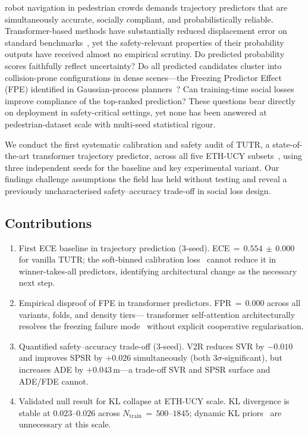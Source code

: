 \documentclass[journal,letterpaper]{IEEEtran}
\begin{document}
 robot navigation in pedestrian crowds demands
trajectory predictors that are simultaneously accurate, socially
compliant, and probabilistically reliable.
Transformer-based methods have substantially reduced displacement error
on standard benchmarks~\cite{shi2023tutr,mohamed2020social}, yet the
safety-relevant properties of their probability outputs have received
almost no empirical scrutiny.
Do predicted probability scores faithfully reflect uncertainty?
Do all predicted candidates cluster into collision-prone configurations
in dense scenes---the Freezing Predictor Effect (FPE) identified in
Gaussian-process planners~\cite{trautman2010unfreezing}?
Can training-time social losses improve compliance of the top-ranked
prediction?
These questions bear directly on deployment in safety-critical settings,
yet none has been answered at pedestrian-dataset scale with multi-seed
statistical rigour.

We conduct the first systematic calibration and safety audit of TUTR,
a state-of-the-art transformer trajectory predictor, across all five
ETH-UCY subsets~\cite{pellegrini2009eth,lerner2007ucy}, using three
independent seeds for the baseline and key experimental variant.
Our findings challenge assumptions the field has held without testing
and reveal a previously uncharacterised safety--accuracy trade-off in
social loss design.

\subsection*{Contributions}

\begin{enumerate}

\item First ECE baseline in trajectory prediction (3-seed).
ECE\,\(=\,0.554\,\pm\,0.000\) for vanilla TUTR; the soft-binned
calibration loss~\cite{karandikar2021soft} cannot reduce it in
winner-takes-all predictors, identifying architectural change as the
necessary next step.

\item Empirical disproof of FPE in transformer predictors.
FPR\,\(=\,0.000\) across all variants, folds, and density tiers---
transformer self-attention architecturally resolves the freezing
failure mode~\cite{trautman2010unfreezing} without explicit cooperative
regularisation.

\item Quantified safety--accuracy trade-off (3-seed).
V2R reduces SVR by \(-0.010\) and improves SPSR by \(+0.026\)
simultaneously (both \(3\sigma\)-significant), but increases ADE
by \(+0.043\)\,m---a trade-off SVR and SPSR surface and ADE/FDE
cannot.

\item Validated null result for KL collapse at ETH-UCY scale.
KL divergence is stable at \(0.023\)--\(0.026\) across
\(N_{\text{train}}\,{=}\,500\)--\(1845\); dynamic KL
priors~\cite{zhang2025openworld} are unnecessary at this scale.

\end{enumerate}
\end{document}
